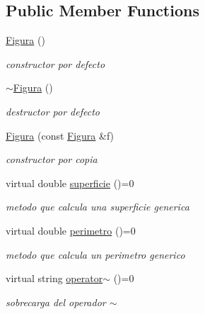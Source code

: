 \subsection*{Public Member Functions}
\begin{DoxyCompactItemize}
\item 
\mbox{\label{class_figura_a6977c7f0438c11b985a9a74c208b51c8}} 
\hyperlink{class_figura_a6977c7f0438c11b985a9a74c208b51c8}{Figura} ()
\begin{DoxyCompactList}\small\item\em constructor por defecto \end{DoxyCompactList}\item 
\mbox{\label{class_figura_a6130eb548893c36efcb7933e2da6821e}} 
\hyperlink{class_figura_a6130eb548893c36efcb7933e2da6821e}{$\sim$\+Figura} ()
\begin{DoxyCompactList}\small\item\em destructor por defecto \end{DoxyCompactList}\item 
\hyperlink{class_figura_a2f55faa2fd40a5ebb2c5d1c958927f2a}{Figura} (const \hyperlink{class_figura}{Figura} \&f)
\begin{DoxyCompactList}\small\item\em constructor por copia \end{DoxyCompactList}\item 
\mbox{\label{class_figura_aaaff1d3f33df845278d20b5eab009fca}} 
virtual double \hyperlink{class_figura_aaaff1d3f33df845278d20b5eab009fca}{superficie} ()=0
\begin{DoxyCompactList}\small\item\em metodo que calcula una superficie generica \end{DoxyCompactList}\item 
\mbox{\label{class_figura_ad41d892aad534c23be85b96671c09d78}} 
virtual double \hyperlink{class_figura_ad41d892aad534c23be85b96671c09d78}{perimetro} ()=0
\begin{DoxyCompactList}\small\item\em metodo que calcula un perimetro generico \end{DoxyCompactList}\item 
\mbox{\label{class_figura_a56c66abd270dbf126bfb2e8d69b646f6}} 
virtual string \hyperlink{class_figura_a56c66abd270dbf126bfb2e8d69b646f6}{operator$\sim$} ()=0
\begin{DoxyCompactList}\small\item\em sobrecarga del operador $\sim$ \end{DoxyCompactList}\end{DoxyCompactItemize}
